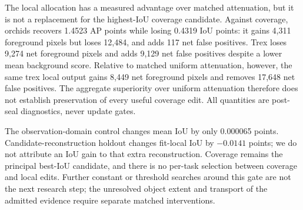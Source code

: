 \begin{table}[ht]
\centering\small
\resizebox{\linewidth}{!}{}
\caption{N03 all-eight IoU. Domain means coverage on the original anchor's
observed domain; uniform matches held-local signed edit mass.}
\label{tab:nvos-local-credit}
\end{table}
\begin{table}[ht]
\centering\small
\caption{N03 macro metrics on retained GT. Every arm uses the same fixed
threshold; AP evaluates continuous scores.}
\label{tab:nvos-local-credit-macro}
\end{table}


The local allocation has a measured advantage over matched attenuation, but
it is not a replacement for the highest-IoU coverage candidate. Against
coverage, orchids recovers 1.4523 AP points while losing 0.4319 IoU points:
it gains 4,311 foreground pixels but loses 12,484, and adds 117 net false
positives. Trex loses 9,274 net foreground pixels and adds 9,129 net false
positives despite a lower mean background score. Relative to matched uniform
attenuation, however, the same trex local output gains 8,449 net foreground
pixels and removes 17,648 net false positives. The aggregate superiority over
uniform attenuation therefore does not establish preservation of every useful
coverage edit. All quantities are post-seal diagnostics, never update gates.

The observation-domain control changes mean IoU by only 0.000065 points.
Candidate-reconstruction holdout changes fit-local IoU by $-0.0141$ points;
we do not attribute an IoU gain to that extra reconstruction. Coverage remains
the principal best-IoU candidate, and there is no per-task selection between
coverage and local edits. Further constant or threshold searches around this
gate are not the next research step; the unresolved object extent and transport
of the admitted evidence require separate matched interventions.


